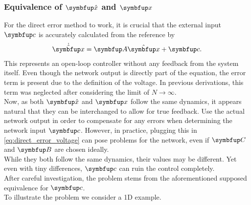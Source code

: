 \subsubsection{Equivalence of $\bmu{\hat{x}}$ and $\bmu{x}$}
For the direct error method to work, it is crucial that the external input $\bmu{c}$ is accurately calculated from the reference by
\begin{equation}
	\dot{\hat{\bmu{x}}} = \bmu{A}\hat{\bmu{x}} + \bmu{c}.
\end{equation}
This represents an open-loop controller without any feedback from the system itself. Even though the network output is directly part of the equation, the error term is present due to the definition of the voltage. In previous derivations, this term was neglected after considering the limit of $N\longrightarrow \infty$.\\
Now, as both $\bmu{\hat{x}}$ and $\bmu{x}$ follow the same dynamics, it appears natural that they can be interchanged to allow for true feedback. Use the actual network output in order to compensate for any errors when determining the network input $\bmu{c}$. However, in practice, plugging this in \cref{eq:direct_error_voltage} can pose problems for the network, even if $\bmu{C}$ and $\bmu{B}$ are chosen ideally.\\
While they both follow the same dynamics, their values may be different. Yet even with tiny differences, $\bmu{c}$ can ruin the control completely.\\
After careful investigation, the problem stems from the aforementioned supposed equivalence for $\bmu{c}$.\\
To illustrate the problem we consider a 1D example.
